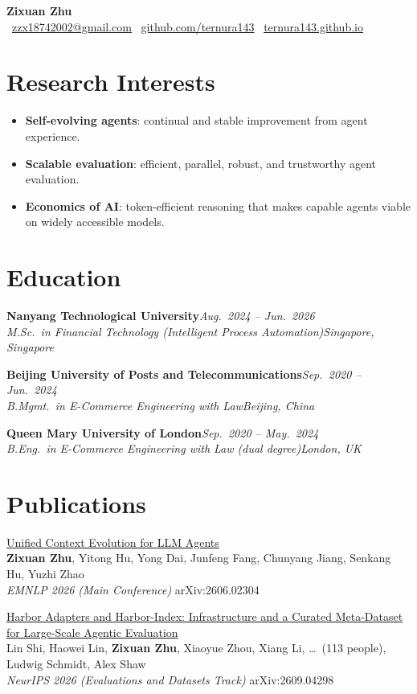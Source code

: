 \documentclass[11pt,a4paper]{article}
\newcommand{\cventry}[4]{%
  \textbf{#1}\hfill\textit{#2}\\[0.1ex]
  \textit{#3}\hfill\textit{#4}\par\vspace{0.2ex}%
}
\begin{document}
\begin{center}
  {\LARGE\bfseries Zixuan Zhu}\\[0.6ex]
  {\small
    \faEnvelope[regular]~\href{mailto:zzx18742002@gmail.com}{zzx18742002@gmail.com}
    \quad
    \faGithub~\href{https://github.com/ternura143}{github.com/ternura143}
    \quad
    \faGlobe~\href{https://ternura143.github.io}{ternura143.github.io}
  }
\end{center}
\vspace{0.4ex}

\section{Research Interests}
\begin{itemize}
  \item \textbf{Self-evolving agents}: continual and stable improvement from agent experience.
  \item \textbf{Scalable evaluation}: efficient, parallel, robust, and trustworthy agent evaluation.
  \item \textbf{Economics of AI}: token-efficient reasoning that makes capable agents viable on widely accessible models.
\end{itemize}

\section{Education}
\cventry{Nanyang Technological University}{Aug.\ 2024 -- Jun.\ 2026}
  {M.Sc.\ in Financial Technology (Intelligent Process Automation)}{Singapore, Singapore}
\cventry{Beijing University of Posts and Telecommunications}{Sep.\ 2020 -- Jun.\ 2024}
  {B.Mgmt.\ in E-Commerce Engineering with Law}{Beijing, China}
\cventry{Queen Mary University of London}{Sep.\ 2020 -- May.\ 2024}
  {B.Eng.\ in E-Commerce Engineering with Law (dual degree)}{London, UK}

\section{Publications}
\href{https://arxiv.org/abs/2606.02304}{Unified Context Evolution for LLM Agents}\\
\textbf{Zixuan Zhu}, Yitong Hu, Yong Dai, Junfeng Fang, Chunyang Jiang, Senkang Hu, Yuzhi Zhao\\
\textit{EMNLP 2026 (Main Conference)} \quad arXiv:2606.02304\par
\href{https://arxiv.org/abs/2609.04298}{Harbor Adapters and Harbor-Index: Infrastructure and a Curated Meta-Dataset for Large-Scale Agentic Evaluation}\\
Lin Shi, Haowei Lin, \textbf{Zixuan Zhu}, Xiaoyue Zhou, Xiang Li, \ldots\ (113 people),
Ludwig Schmidt, Alex Shaw\\
\textit{NeurIPS 2026 (Evaluations and Datasets Track)} \quad arXiv:2609.04298
\end{document}
